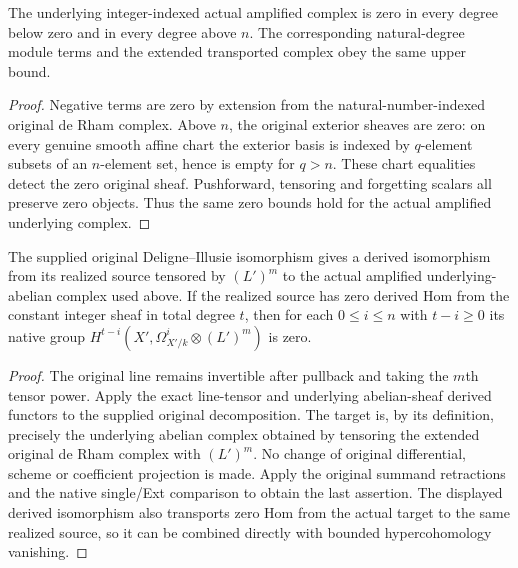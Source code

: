 \begin{lemma}
\label{lem:kn-amplified-cartier-bounded}
\leanok
{}
The underlying integer-indexed actual amplified complex is zero in
every degree below zero and in every degree above $n$.
The corresponding natural-degree module terms and the extended
transported complex obey the same upper bound.
\end{lemma}
\begin{proof}
Negative terms are zero by extension from the natural-number-indexed
original de Rham complex.  Above $n$, the original exterior sheaves
are zero: on every genuine smooth affine chart the exterior basis
is indexed by $q$-element subsets of an $n$-element set, hence is
empty for $q>n$.  These chart equalities detect the zero original
sheaf.  Pushforward, tensoring and forgetting scalars all preserve
zero objects.  Thus the same zero bounds hold for the actual
amplified underlying complex.
\end{proof}

\begin{lemma}
\label{lem:kn-di-amplified-target}
\leanok
{}
The supplied original Deligne--Illusie isomorphism gives a derived
isomorphism from its realized source tensored by $(L')^m$ to the
actual amplified underlying-abelian complex used above.
If the realized source has zero derived Hom from the constant integer
sheaf in total degree $t$, then for each $0\leq i\leq n$ with
$t-i\geq0$ its native group
$H^{t-i}(X',\Omega^i_{X'/k}\otimes(L')^m)$ is zero.
\end{lemma}
\begin{proof}
The original line remains invertible after pullback and taking the
$m$th tensor power.  Apply the exact line-tensor and underlying
abelian-sheaf derived functors to the supplied original
decomposition.  The target is, by its definition, precisely the
underlying abelian complex obtained by tensoring the extended
original de Rham complex with $(L')^m$.  No change of original
differential, scheme or coefficient projection is made.
Apply the original summand retractions and the native single/Ext
comparison to obtain the last assertion.  The displayed derived
isomorphism also transports zero Hom from the actual target to the
same realized source, so it can be combined directly with bounded
hypercohomology vanishing.
\end{proof}
